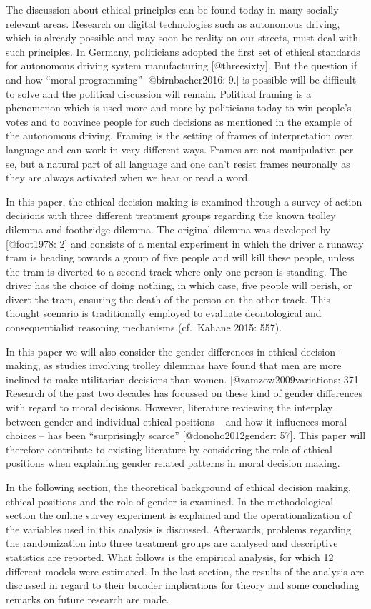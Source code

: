 \documentclass[]{article}
\title{}
\author{}
\date{}
\begin{document}
The discussion about ethical principles can be found today in many
socially relevant areas. Research on digital technologies such as
autonomous driving, which is already possible and may soon be reality on
our streets, must deal with such principles. In Germany, politicians
adopted the first set of ethical standards for autonomous driving system
manufacturing {[}@threesixty{]}. But the question if and how ``moral
programming'' {[}@birnbacher2016: 9.{]} is possible will be difficult to
solve and the political discussion will remain. Political framing is a
phenomenon which is used more and more by politicians today to win
people's votes and to convince people for such decisions as mentioned in
the example of the autonomous driving. Framing is the setting of frames
of interpretation over language and can work in very different ways.
Frames are not manipulative per se, but a natural part of all language
and one can't resist frames neuronally as they are always activated when
we hear or read a word.

In this paper, the ethical decision-making is examined through a survey
of action decisions with three different treatment groups regarding the
known trolley dilemma and footbridge dilemma. The original dilemma was
developed by {[}@foot1978: 2{]} and consists of a mental experiment in
which the driver a runaway tram is heading towards a group of five
people and will kill these people, unless the tram is diverted to a
second track where only one person is standing. The driver has the
choice of doing nothing, in which case, five people will perish, or
divert the tram, ensuring the death of the person on the other track.
This thought scenario is traditionally employed to evaluate
deontological and consequentialist reasoning mechanisms (cf.~Kahane
2015: 557).

In this paper we will also consider the gender differences in ethical
decision-making, as studies involving trolley dilemmas have found that
men are more inclined to make utilitarian decisions than women.
{[}@zamzow2009variations: 371{]} Research of the past two decades has
focussed on these kind of gender differences with regard to moral
decisions. However, literature reviewing the interplay between gender
and individual ethical positions -- and how it influences moral choices
-- has been ``surprisingly scarce'' {[}@donoho2012gender: 57{]}. This
paper will therefore contribute to existing literature by considering
the role of ethical positions when explaining gender related patterns in
moral decision making.

In the following section, the theoretical background of ethical decision
making, ethical positions and the role of gender is examined. In the
methodological section the online survey experiment is explained and the
operationalization of the variables used in this analysis is discussed.
Afterwards, problems regarding the randomization into three treatment
groups are analysed and descriptive statistics are reported. What
follows is the empirical analysis, for which 12 different models were
estimated. In the last section, the results of the analysis are
discussed in regard to their broader implications for theory and some
concluding remarks on future research are made.
\end{document}
